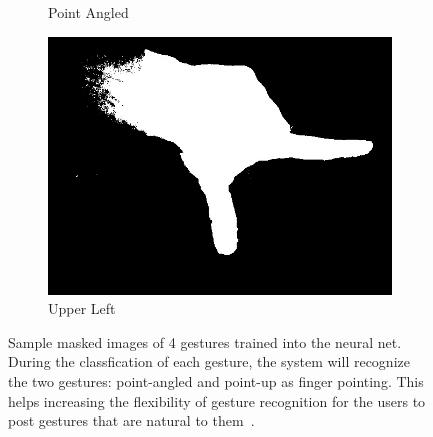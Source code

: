 \begin{figure}
\begin{subfigure}[b]{0.25\columnwidth}
\caption{Point Angled}
\end{subfigure}%
\begin{subfigure}[b]{0.25\columnwidth}
\centering
\includegraphics[width=0.95\columnwidth]{ch5/figs/upper_left_corner.png}
\caption{Upper Left}
\end{subfigure}
\caption{Sample masked images of 4 gestures trained into the neural net.
During the classfication of each gesture, the system will recognize the
two gestures: point-angled and point-up as finger pointing. This helps
increasing the flexibility of gesture recognition for the users to post
gestures that are natural to them~\cite{lo2013augmediated}.}
\label{gestures}
\end{figure}

